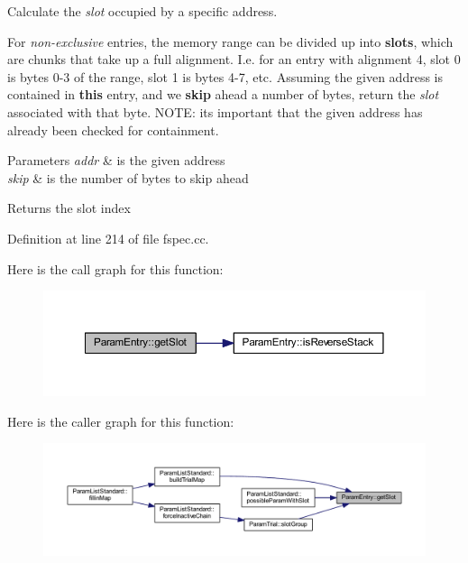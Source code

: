 Calculate the {\itshape slot} occupied by a specific address. 

For {\itshape non-\/exclusive} entries, the memory range can be divided up into {\bfseries{slots}}, which are chunks that take up a full alignment. I.\+e. for an entry with alignment 4, slot 0 is bytes 0-\/3 of the range, slot 1 is bytes 4-\/7, etc. Assuming the given address is contained in {\bfseries{this}} entry, and we {\bfseries{skip}} ahead a number of bytes, return the {\itshape slot} associated with that byte. N\+O\+TE\+: its important that the given address has already been checked for containment. 
\begin{DoxyParams}{Parameters}
{\em addr} & is the given address \\
\hline
{\em skip} & is the number of bytes to skip ahead \\
\hline
\end{DoxyParams}
\begin{DoxyReturn}{Returns}
the slot index 
\end{DoxyReturn}


Definition at line 214 of file fspec.\+cc.

Here is the call graph for this function\+:
\nopagebreak
\begin{figure}[H]
\begin{center}
\leavevmode
\includegraphics[width=350pt]{class_param_entry_af5f3ce2b0cce7b2400a14ab3abc37cd9_cgraph}
\end{center}
\end{figure}
Here is the caller graph for this function\+:
\nopagebreak
\begin{figure}[H]
\begin{center}
\leavevmode
\includegraphics[width=350pt]{class_param_entry_af5f3ce2b0cce7b2400a14ab3abc37cd9_icgraph}
\end{center}
\end{figure}
\mbox{\label{class_param_entry_a498cd78bbe7fa439beeaf8243eed9177}} 
